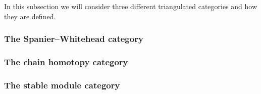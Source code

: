 In this subsection we will consider three different triangulated categories and how they are defined.

\subsubsection{The Spanier--Whitehead category}
\label{subsubsection:spanier_whitehead_cat}


\subsubsection{The chain homotopy category}
\label{subsubsection:chain_homotopy_cat}


\subsubsection{The stable module category}
\label{subsubsection:stable_module_cat}
